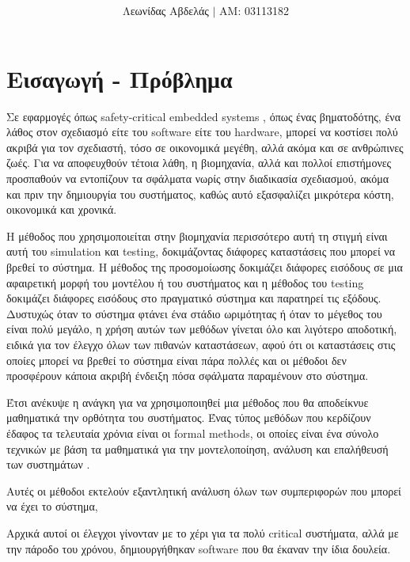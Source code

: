 \documentclass{article}
\title{\english{System verification with} \\
    \english{Model Checking}}
\newcommand{\english}[1]{\foreignlanguage{english}{{#1}}}
\begin{document}
\date{}
\author{Λεωνίδας Αβδελάς $|$ ΑΜ: 03113182}

\maketitle

\section*{Εισαγωγή - Πρόβλημα}

Σε εφαρμογές όπως \english{safety-critical embedded systems} \cite{colin}, όπως ένας βηματοδότης, ένα λάθος στον σχεδιασμό είτε του \english{software} είτε του \english{hardware}, μπορεί να κοστίσει πολύ ακριβά για τον σχεδιαστή, τόσο σε οικονομικά μεγέθη, αλλά ακόμα και σε ανθρώπινες ζωές. Για να αποφευχθούν τέτοια λάθη, η βιομηχανία, αλλά και πολλοί επιστήμονες προσπαθούν να εντοπίζουν τα σφάλματα νωρίς στην διαδικασία σχεδιασμού, ακόμα και πριν την δημιουργία του συστήματος, καθώς αυτό εξασφαλίζει μικρότερα κόστη, οικονομικά και χρονικά. 

Η μέθοδος που χρησιμοποιείται στην βιομηχανία περισσότερο αυτή τη στιγμή είναι αυτή του \english{simulation} και \english{testing}, δοκιμάζοντας διάφορες καταστάσεις που μπορεί να βρεθεί το σύστημα. Η μέθοδος της προσομοίωσης δοκιμάζει διάφορες εισόδους σε μια αφαιρετική μορφή του μοντέλου ή του συστήματος και η μέθοδος του \english{testing} δοκιμάζει διάφορες εισόδους στο πραγματικό σύστημα και παρατηρεί τις εξόδους. Δυστυχώς όταν το σύστημα φτάνει ένα στάδιο ωριμότητας ή όταν το μέγεθος του είναι πολύ μεγάλο, η χρήση αυτών των μεθόδων γίνεται όλο και λιγότερο αποδοτική, ειδικά για τον έλεγχο όλων των πιθανών καταστάσεων, αφού ότι οι καταστάσεις στις οποίες μπορεί να βρεθεί το σύστημα είναι πάρα πολλές και οι μέθοδοι δεν προσφέρουν κάποια ακριβή ένδειξη πόσα σφάλματα παραμένουν στο σύστημα.

Έτσι ανέκυψε η ανάγκη για να χρησιμοποιηθεί μια μέθοδος που θα αποδείκνυε μαθηματικά την ορθότητα του συστήματος. Ένας τύπος μεθόδων που κερδίζουν έδαφος τα τελευταία χρόνια είναι οι \english{formal methods}, οι οποίες είναι ένα σύνολο τεχνικών με βάση τα μαθηματικά για την μοντελοποίηση, ανάλυση και επαλήθευσή των συστημάτων \cite{manifesto}.

Αυτές οι μέθοδοι εκτελούν εξαντλητική ανάλυση όλων των συμπεριφορών που μπορεί να έχει το σύστημα,  

Αρχικά αυτοί οι έλεγχοι γίνονταν με το χέρι για τα πολύ critical συστήματα, αλλά με την πάροδο του χρόνου, δημιουργήθηκαν software που θα έκαναν την ίδια δουλεία.
\end{document}
